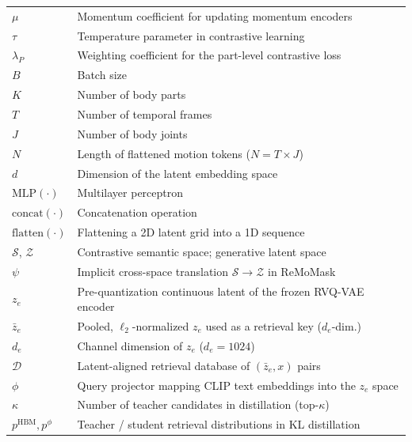 \documentclass[10pt,journal,compsoc]{IEEEtran}
\begin{document}
\begin{table}[t]
{\begin{tabular}{p{2.2cm} | l}
$\mu$ & Momentum coefficient for updating momentum encoders \\

$\tau$ & Temperature parameter in contrastive learning \\

$\lambda_{P}$ & Weighting coefficient for the part-level contrastive loss \\

$B$ & Batch size \\

$K$ & Number of body parts \\

$T$ & Number of temporal frames \\

$J$ & Number of body joints \\

$N$ & Length of flattened motion tokens ($N=T \times J$) \\

$d$ & Dimension of the latent embedding space \\

$\mathrm{MLP}(\cdot)$ & Multilayer perceptron \\

$\mathrm{concat}(\cdot)$ & Concatenation operation \\

$\mathrm{flatten}(\cdot)$ & Flattening a 2D latent grid into a 1D sequence \\

\midrule

$\mathcal{S}$, $\mathcal{Z}$ & Contrastive semantic space; generative latent space \\

$\psi$ & Implicit cross-space translation $\mathcal{S} \rightarrow \mathcal{Z}$ in ReMoMask \\

$z_e$ & Pre-quantization continuous latent of the frozen RVQ-VAE encoder \\

$\bar{z}_e$ & Pooled, $\ell_2$-normalized $z_e$ used as a retrieval key ($d_e$-dim.) \\

$d_e$ & Channel dimension of $z_e$ ($d_e = 1024$) \\

$\mathcal{D}$ & Latent-aligned retrieval database of $(\bar{z}_e, x)$ pairs \\

$\phi$ & Query projector mapping CLIP text embeddings into the $z_e$ space \\

$\kappa$ & Number of teacher candidates in distillation (top-$\kappa$) \\

$p^{\mathrm{HBM}}, p^{\phi}$ & Teacher / student retrieval distributions in KL distillation \\

\bottomrule
\end{tabular}
}
\label{tab:notation}
\end{table}
\end{document}
